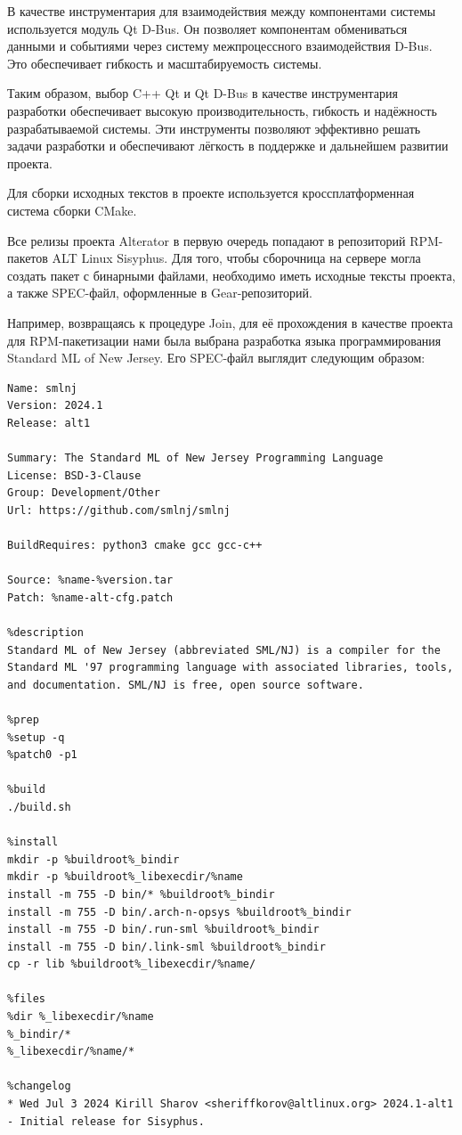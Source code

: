 \documentclass[bachelor, och, pract]{SCWorks}
\begin{document}
В качестве инструментария для взаимодействия между компонентами системы используется модуль Qt D-Bus.
Он позволяет компонентам обмениваться данными и событиями через систему межпроцессного взаимодействия D-Bus.
Это обеспечивает гибкость и масштабируемость системы.

Таким образом, выбор C++ Qt и Qt D-Bus в качестве инструментария разработки обеспечивает высокую производительность, гибкость и надёжность разрабатываемой системы.
Эти инструменты позволяют эффективно решать задачи разработки и обеспечивают лёгкость в поддержке и дальнейшем развитии проекта.

Для сборки исходных текстов в проекте используется кроссплатформенная система сборки CMake.

Все релизы проекта Alterator в первую очередь попадают в репозиторий RPM-пакетов ALT Linux Sisyphus.
Для того, чтобы сборочница на сервере могла создать пакет с бинарными файлами, необходимо иметь исходные тексты проекта, а также SPEC-файл, оформленные в Gear-репозиторий.

Например, возвращаясь к процедуре Join, для её прохождения в качестве проекта для RPM-пакетизации нами была выбрана разработка языка программирования Standard ML of New Jersey\cite{a_smlnj}.
Его SPEC-файл выглядит следующим образом:

\begin{verbatim}
Name: smlnj
Version: 2024.1
Release: alt1

Summary: The Standard ML of New Jersey Programming Language
License: BSD-3-Clause
Group: Development/Other
Url: https://github.com/smlnj/smlnj

BuildRequires: python3 cmake gcc gcc-c++

Source: %name-%version.tar
Patch: %name-alt-cfg.patch 

%description
Standard ML of New Jersey (abbreviated SML/NJ) is a compiler for the Standard ML '97 programming language with associated libraries, tools, and documentation. SML/NJ is free, open source software.

%prep
%setup -q
%patch0 -p1

%build
./build.sh

%install
mkdir -p %buildroot%_bindir
mkdir -p %buildroot%_libexecdir/%name
install -m 755 -D bin/* %buildroot%_bindir
install -m 755 -D bin/.arch-n-opsys %buildroot%_bindir
install -m 755 -D bin/.run-sml %buildroot%_bindir
install -m 755 -D bin/.link-sml %buildroot%_bindir
cp -r lib %buildroot%_libexecdir/%name/

%files
%dir %_libexecdir/%name
%_bindir/*
%_libexecdir/%name/*

%changelog
* Wed Jul 3 2024 Kirill Sharov <sheriffkorov@altlinux.org> 2024.1-alt1
- Initial release for Sisyphus.
\end{verbatim}
\end{document}
